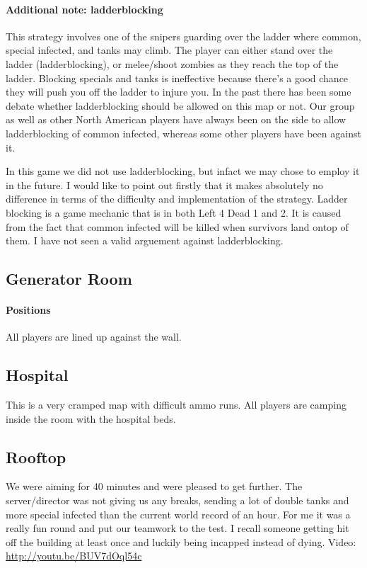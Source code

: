 \paragraph{Additional note: ladderblocking}
This strategy involves one of the snipers guarding over the ladder where common, special infected, and tanks may climb. The player can either stand over the ladder (ladderblocking), or melee/shoot zombies as they reach the top of the ladder. Blocking specials and tanks is ineffective because there's a good chance they will push you off the ladder to injure you. In the past there has been some debate whether ladderblocking should be allowed on this map or not. Our group as well as other North American players have always been on the side to allow ladderblocking of common infected, whereas some other players have been against it.

In this game we did not use ladderblocking, but infact we may chose to employ it in the future. I would like to point out firstly that it makes absolutely no difference in terms of the difficulty and implementation of the strategy. Ladder blocking is a game mechanic that is in both Left 4 Dead 1 and 2. It is caused from the fact that common infected will be killed when survivors land ontop of them. I have not seen a valid arguement against ladderblocking.

\subsection{Generator Room}
\paragraph{Positions}
All players are lined up against the wall.

\subsection{Hospital}
This is a very cramped map with difficult ammo runs. All players are camping inside the room with the hospital beds.

\subsection{Rooftop}
We were aiming for 40 minutes and were pleased to get further. The server/director was not giving us any breaks, sending a lot of double tanks and more special infected than the current world record of an hour. For me it was a really fun round and put our teamwork to the test. I recall someone getting hit off the building at least once and luckily being incapped instead of dying. Video: \url{http://youtu.be/BUV7dOql54c}

